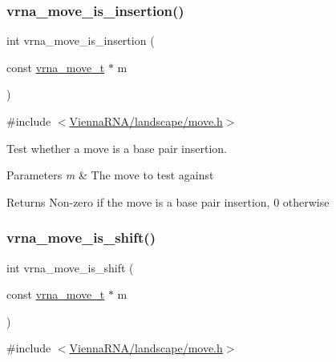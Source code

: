 \subsubsection{\texorpdfstring{vrna\_move\_is\_insertion()}{vrna\_move\_is\_insertion()}}
{\footnotesize\ttfamily int vrna\+\_\+move\+\_\+is\+\_\+insertion (\begin{DoxyParamCaption}\item[{const \mbox{\hyperlink{group__neighbors_ga08630e00206cd163ea29c462bf5f4755}{vrna\+\_\+move\+\_\+t}} $\ast$}]{m }\end{DoxyParamCaption})}



{\ttfamily \#include $<$\mbox{\hyperlink{move_8h}{Vienna\+R\+N\+A/landscape/move.\+h}}$>$}



Test whether a move is a base pair insertion. 


\begin{DoxyParams}{Parameters}
{\em m} & The move to test against \\
\hline
\end{DoxyParams}
\begin{DoxyReturn}{Returns}
Non-\/zero if the move is a base pair insertion, 0 otherwise 
\end{DoxyReturn}
\mbox{\label{group__neighbors_ga31a8c4c2db9f54cb8f2d2cdf3b725d4d}} 
\subsubsection{\texorpdfstring{vrna\_move\_is\_shift()}{vrna\_move\_is\_shift()}}
{\footnotesize\ttfamily int vrna\+\_\+move\+\_\+is\+\_\+shift (\begin{DoxyParamCaption}\item[{const \mbox{\hyperlink{group__neighbors_ga08630e00206cd163ea29c462bf5f4755}{vrna\+\_\+move\+\_\+t}} $\ast$}]{m }\end{DoxyParamCaption})}



{\ttfamily \#include $<$\mbox{\hyperlink{move_8h}{Vienna\+R\+N\+A/landscape/move.\+h}}$>$}



